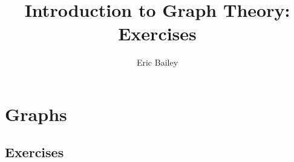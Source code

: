 \documentclass[nobib]{tufte-book}
\title{Introduction to Graph Theory: Exercises}
\author{Eric Bailey}
\begin{document}
\frontmatter


\maketitle

\tableofcontents



\mainmatter

\chapter{Graphs}
\label{ch:graphs}

\section{Exercises}
\end{document}
